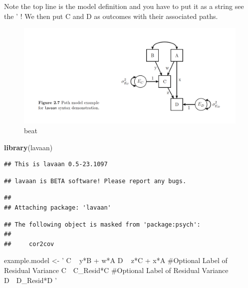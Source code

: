 \documentclass[]{book}
\newenvironment{Shaded}{\begin{snugshade}}{\end{snugshade}}
\newcommand{\KeywordTok}[1]{\textcolor[rgb]{0.13,0.29,0.53}{\textbf{#1}}}
\newcommand{\StringTok}[1]{\textcolor[rgb]{0.31,0.60,0.02}{#1}}
\newcommand{\NormalTok}[1]{#1}
\theoremstyle{definition}
\theoremstyle{definition}
\theoremstyle{definition}
\theoremstyle{remark}
\begin{document}
Note the top line is the model definition and you have to put it as a
string see the ' ! We then put C and D as outcomes with their associated
paths.

\begin{figure}
\centering
\includegraphics{img/beaupath3.png}
\caption{beat}
\end{figure}

\begin{Shaded}
\begin{Highlighting}[]
 \KeywordTok{library}\NormalTok{(lavaan)}
\end{Highlighting}
\end{Shaded}

\begin{verbatim}
## This is lavaan 0.5-23.1097
\end{verbatim}

\begin{verbatim}
## lavaan is BETA software! Please report any bugs.
\end{verbatim}

\begin{verbatim}
## 
## Attaching package: 'lavaan'
\end{verbatim}

\begin{verbatim}
## The following object is masked from 'package:psych':
## 
##     cor2cov
\end{verbatim}

\begin{Shaded}
\begin{Highlighting}[]
\NormalTok{ example.model <-}\StringTok{ '}
\StringTok{ C ~ y*B + w*A}
\StringTok{ D ~ z*C + x*A}
\StringTok{ #Optional Label of Residual Variance}
\StringTok{ C~~C_Resid*C}
\StringTok{ #Optional Label of Residual Variance}
\StringTok{ D~~D_Resid*D}
\StringTok{ '} 
\end{Highlighting}
\end{Shaded}
\end{document}
